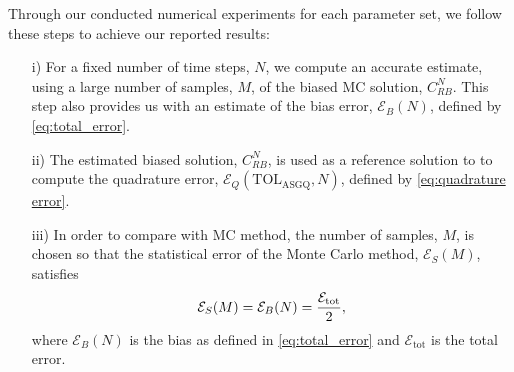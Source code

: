 Through our conducted numerical experiments for each parameter set, we follow these steps to achieve our reported results:

\begin{enumerate}
\item[i)] For a fixed number of time steps, $N$, we compute an accurate estimate, using a large number of samples, $M$, of the biased  MC solution, $C_{RB}^{N}$. This step also provides us with an estimate of the bias error, $\mathcal{E}_B(N)$, defined by \eqref{eq:total_error}. 
\item[ii)] The estimated  biased solution,  $C_{RB}^{N}$, is used as a reference solution  to  to compute the quadrature error, $\mathcal{E}_Q(\text{TOL}_{\text{ASGQ}},N)$, defined by \eqref{eq:quadrature error}.
\item[iii)] In order to compare with MC method, the number of samples, $M$, is chosen so that  the statistical error of the Monte Carlo  method, $\mathcal{E}_S(M)$, satisfies
\begin{align}\label{optimal_number_samples}
\mathcal{E}_S(M)= \mathcal{E}_B(N)=\frac{\mathcal{E}_{\text{tot}}}{2},
\end{align}
where $\mathcal{E}_B(N)$ is the bias as defined in \eqref{eq:total_error} and
$\mathcal{E}_{\text{tot}}$ is the total error. 
\end{enumerate}

